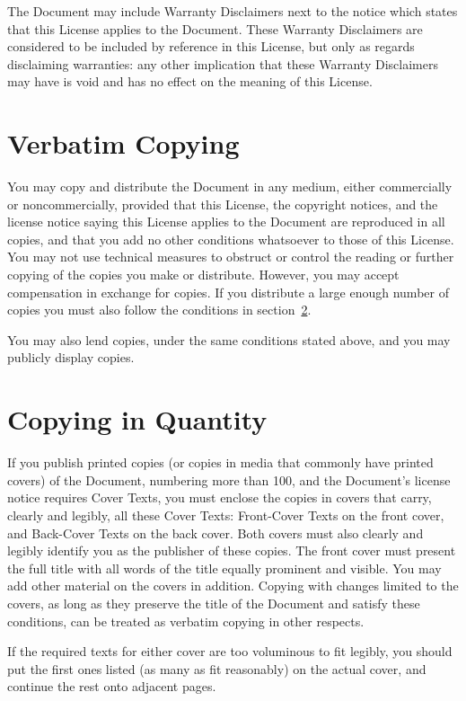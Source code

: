 The Document may include Warranty Disclaimers next to the notice which
states that this License applies to the Document.  These Warranty
Disclaimers are considered to be included by reference in this
License, but only as regards disclaiming warranties: any other
implication that these Warranty Disclaimers may have is void and has
no effect on the meaning of this License.


\section{Verbatim Copying}
\label{sec:verbatim-copying}

You may copy and distribute the Document in any medium, either
commercially or noncommercially, provided that this License, the
copyright notices, and the license notice saying this License applies
to the Document are reproduced in all copies, and that you add no
other conditions whatsoever to those of this License.  You may not use
technical measures to obstruct or control the reading or further
copying of the copies you make or distribute.  However, you may accept
compensation in exchange for copies.  If you distribute a large enough
number of copies you must also follow the conditions in
section~\ref{sec:copying-quantity}.

You may also lend copies, under the same conditions stated above, and
you may publicly display copies.


\section{Copying in Quantity}
\label{sec:copying-quantity}

If you publish printed copies (or copies in media that commonly have
printed covers) of the Document, numbering more than 100, and the
Document's license notice requires Cover Texts, you must enclose the
copies in covers that carry, clearly and legibly, all these Cover
Texts: Front-Cover Texts on the front cover, and Back-Cover Texts on
the back cover.  Both covers must also clearly and legibly identify
you as the publisher of these copies.  The front cover must present
the full title with all words of the title equally prominent and
visible.  You may add other material on the covers in addition.
Copying with changes limited to the covers, as long as they preserve
the title of the Document and satisfy these conditions, can be treated
as verbatim copying in other respects.

If the required texts for either cover are too voluminous to fit
legibly, you should put the first ones listed (as many as fit
reasonably) on the actual cover, and continue the rest onto adjacent
pages.

